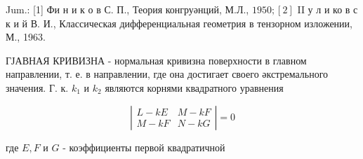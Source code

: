 \documentclass[10pt]{article}
\begin{document}
Jum.: [1] Фи н и к о в С. П., Теория конгруәнций, М.Л., $1950 ;[2]$ II у л и ко в с к и й В. И., Классическая дифференциальная геометрия в тензорном изложении, М., 1963.



ГЈАВНАЯ КРИВИЗНА - нормальная кривизна поверхности в главном направлении, т. е. в направлении, где она достигает своего әкстремального значения. Г. к. $k_{1}$ и $k_{2}$ являются корнями квадратного уравнения



\[

\left|\begin{array}{lc}

L-k E & M-k F \\

M-k F & N-k G

\end{array}\right|=0

\]



где $E, F$ и $G$ - коэффициенты первой квадратичной
\end{document}
